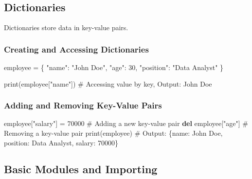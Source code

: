 \documentclass[
  letterpaper,
  DIV=11,
  numbers=noendperiod]{scrreprt}
\newenvironment{Shaded}{\begin{snugshade}}{\end{snugshade}}
\newcommand{\BuiltInTok}[1]{\textcolor[rgb]{0.00,0.23,0.31}{#1}}
\newcommand{\CommentTok}[1]{\textcolor[rgb]{0.37,0.37,0.37}{#1}}
\newcommand{\DecValTok}[1]{\textcolor[rgb]{0.68,0.00,0.00}{#1}}
\newcommand{\KeywordTok}[1]{\textcolor[rgb]{0.00,0.23,0.31}{\textbf{#1}}}
\newcommand{\NormalTok}[1]{\textcolor[rgb]{0.00,0.23,0.31}{#1}}
\newcommand{\OperatorTok}[1]{\textcolor[rgb]{0.37,0.37,0.37}{#1}}
\newcommand{\StringTok}[1]{\textcolor[rgb]{0.13,0.47,0.30}{#1}}
\begin{document}
\subsection{Dictionaries}\label{dictionaries}

Dictionaries store data in key-value pairs.

\subsubsection{Creating and Accessing
Dictionaries}\label{creating-and-accessing-dictionaries}

\begin{Shaded}
\begin{Highlighting}[]
\NormalTok{employee }\OperatorTok{=}\NormalTok{ \{}
    \StringTok{"name"}\NormalTok{: }\StringTok{"John Doe"}\NormalTok{,}
    \StringTok{"age"}\NormalTok{: }\DecValTok{30}\NormalTok{,}
    \StringTok{"position"}\NormalTok{: }\StringTok{"Data Analyst"}
\NormalTok{\}}

\BuiltInTok{print}\NormalTok{(employee[}\StringTok{"name"}\NormalTok{])  }\CommentTok{\# Accessing value by key, Output: John Doe}
\end{Highlighting}
\end{Shaded}

\subsubsection{Adding and Removing Key-Value
Pairs}\label{adding-and-removing-key-value-pairs}

\begin{Shaded}
\begin{Highlighting}[]
\NormalTok{employee[}\StringTok{"salary"}\NormalTok{] }\OperatorTok{=} \DecValTok{70000}  \CommentTok{\# Adding a new key{-}value pair}
\KeywordTok{del}\NormalTok{ employee[}\StringTok{"age"}\NormalTok{]         }\CommentTok{\# Removing a key{-}value pair}
\BuiltInTok{print}\NormalTok{(employee)  }\CommentTok{\# Output: \{\textquotesingle{}name\textquotesingle{}: \textquotesingle{}John Doe\textquotesingle{}, \textquotesingle{}position\textquotesingle{}: \textquotesingle{}Data Analyst\textquotesingle{}, \textquotesingle{}salary\textquotesingle{}: 70000\}}
\end{Highlighting}
\end{Shaded}

\subsection{Basic Modules and
Importing}\label{basic-modules-and-importing}
\end{document}
